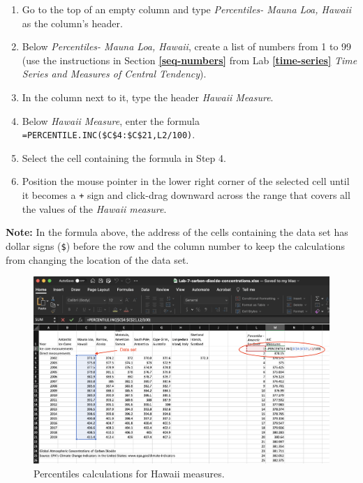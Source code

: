 \documentclass[
]{book}
\begin{document}
\begin{enumerate}
\def\labelenumi{\arabic{enumi}.}
\item
  Go to the top of an empty column and type \emph{Percentiles- Mauna Loa, Hawaii} as the column's header.
\item
  Below \emph{Percentiles- Mauna Loa, Hawaii}, create a list of numbers from 1 to 99 (use the instructions in Section \textbf{\ref{seq-numbers}} from Lab \textbf{\ref{time-series}} \emph{Time Series and Measures of Central Tendency}).
\item
  In the column next to it, type the header \emph{Hawaii Measure}.
\item
  Below \emph{Hawaii Measure}, enter the formula \texttt{=PERCENTILE.INC(\$C\$4:\$C\$21,L2/100)}.
\item
  Select the cell containing the formula in Step 4.
\item
  Position the mouse pointer in the lower right corner of the selected cell until it becomes a \texttt{+} sign and click-drag downward across the range that covers all the values of the \emph{Hawaii measure}.
\end{enumerate}

\textbf{Note:} In the formula above, the address of the cells containing the data set has dollar signs (\texttt{\$}) before the row and the column number to keep the calculations from changing the location of the data set.

\begin{figure}

{\centering \includegraphics[width=1\linewidth]{percentiles} 

}

\caption{Percentiles calculations for Hawaii measures.}\label{fig:percentiles}
\end{figure}
\end{document}
